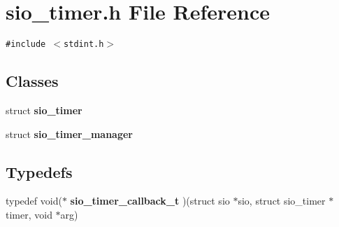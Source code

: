 \section{sio\_\-timer.h File Reference}
\label{sio__timer_8h}
{\tt \#include $<$stdint.h$>$}\par
\subsection*{Classes}
\begin{CompactItemize}
\item 
struct {\bf sio\_\-timer}
\item 
struct {\bf sio\_\-timer\_\-manager}
\end{CompactItemize}
\subsection*{Typedefs}
\begin{CompactItemize}
\item 
typedef void($\ast$ {\bf sio\_\-timer\_\-callback\_\-t} )(struct sio $\ast$sio, struct sio\_\-timer $\ast$timer, void $\ast$arg)\label{sio__timer_8h_a0}

\end{CompactItemize}
